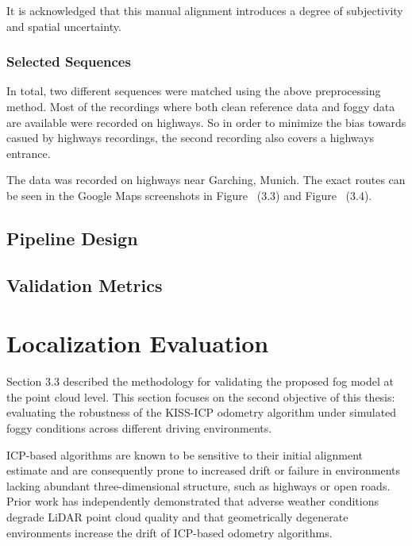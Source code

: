 It is acknowledged that this manual alignment introduces a degree of subjectivity and spatial uncertainty. 


\subsubsection{Selected Sequences}

In total, two different sequences were matched using the above preprocessing method. 
Most of the recordings where both clean reference data and foggy data are available were recorded on highways. So in order to minimize the bias towards casued by highways recordings, the second recording also covers a highways entrance. 

The data was recorded on highways near Garching, Munich. The exact routes can be seen in the Google Maps screenshots in Figure ~(3.3) and Figure ~(3.4).

\subsection{Pipeline Design}


\subsection{Validation Metrics}

\section{Localization Evaluation}
Section 3.3 described the methodology for validating the proposed fog model at the point cloud level. This section focuses on the second objective of this thesis: evaluating the robustness of the KISS-ICP odometry algorithm under simulated foggy conditions across different driving environments.

ICP-based algorithms are known to be sensitive to their initial alignment estimate and are consequently prone to increased drift or failure in environments lacking abundant three-dimensional structure, such as highways or open roads. %
Prior work has independently demonstrated that adverse weather conditions degrade LiDAR point cloud quality \cite{bijelic_benchmark_2018, haider_methodology_2023, teufel_simulating_2022} and that geometrically degenerate environments increase the drift of ICP-based odometry algorithms. %


